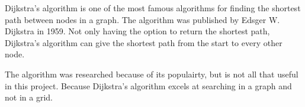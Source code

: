 Dijkstra's algorithm is one of the most famous algorithms for finding the shortest path between nodes in a graph. The algorithm was published by Edsger W. Dijkstra in 1959. Not only having the option to return the shortest path, Dijkstra's algorithm can give the shortest path from the start to every other node.

The algorithm was researched because of its populairty, but is not all that useful in this project. Because Dijkstra's algorithm excels at searching in a graph and not in a grid.